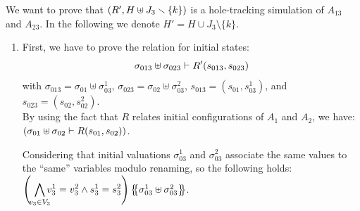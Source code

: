 \documentclass[runningheads]{llncs}
\begin{document}
We want to prove that ${\left(R', H\uplus J_3 \smallsetminus\{k\}\right)}$ is a hole-tracking simulation of $A_{13}$ and $A_{23}$. In the following we denote $H'=H\cup J_3 \setminus\{k\}$.
\begin{enumerate}
\item First, we have to prove the relation for initial states:
\[\sigma_{013} \uplus \sigma_{023} \vdash R'{\left(s_{013}, s_{023}\right)}\]
with $\sigma_{013} = \sigma_{01} \uplus \sigma_{03}^1$, $\sigma_{023} = \sigma_{02} \uplus \sigma_{03}^2$, $s_{013}=(s_{01},s_{03}^1)$, and $s_{023}=(s_{02},s_{02}^2)$.\\
By using the fact that $R$ relates initial configurations of  $A_1$ and $A_2$, we have:
${\left(\sigma_{01} \uplus \sigma_{02} \vdash R{\left(s_{01}, s_{02}\right)}\right)}$.  

Considering that initial valuations $\sigma_{03}^1$ and $\sigma_{03}^2$ associate the same values to the ``same'' variables modulo renaming, so the following holds:\\ $\left(\,\,{\displaystyle \bigwedge_\subbox{v_3\in V_3} v^1_3=v^2_3\wedge s^1_3 = s^2_3}\right)\psubst{\sigma_{03}^1 \uplus \sigma_{03}^2 }$.


\end{enumerate}
\end{document}

